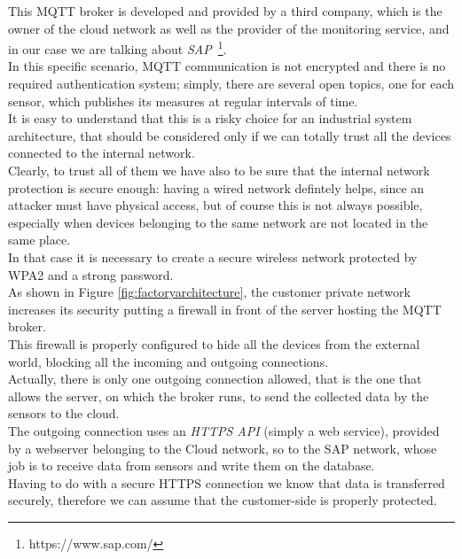 \documentclass[12pt]{report}
\begin{document}
{This MQTT broker is developed and provided by a third company, which is the owner of the cloud network as well as the provider of the monitoring service, and in our case we are talking about \emph{SAP}~\footnote{https://www.sap.com/}.\\
In this specific scenario, MQTT communication is not encrypted and there is no required authentication system; simply, there are several open topics, one for each sensor, which publishes its measures at regular intervals of time.\\
It is easy to understand that this is a risky choice for an industrial system architecture, that should be considered only if we can totally trust all the devices connected to the internal network.\\
Clearly, to trust all of them we have also to be sure that the internal network protection is secure enough: having a wired network defintely helps, since an attacker must have physical access, but of course this is not always possible, especially when devices belonging to the same network are not located in the same place.\\
In that case it is necessary to create a secure wireless network protected by WPA2 and a strong password.\\

As shown in Figure \ref{fig:factoryarchitecture}, the customer private network increases its security putting a firewall in front of the server hosting the MQTT broker.\\
This firewall is properly configured to hide all the devices from the external world, blocking all the incoming and outgoing connections.\\
Actually, there is only one outgoing connection allowed, that is the one that allows the server, on which the broker runs, to send the collected data by the sensors to the cloud.\\

The outgoing connection uses an \emph{HTTPS API} (simply a web service), provided by a webserver belonging to the Cloud network, so to the SAP network, whose job is to receive data from sensors and write them on the database.\\
Having to do with a secure HTTPS connection we know that data is transferred securely, therefore we can assume that the customer-side is properly protected.\\

}
\end{document}
